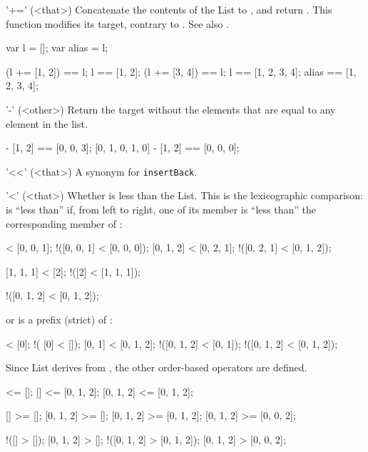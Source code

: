 \begin{urbiscriptapi}
\item['+='](<that>)%
  Concatenate the contents of the List  to \this, and return
  \this.  This function modifies its target, contrary to .  See
  also .

\begin{urbiassert}
var l = [];
var alias = l;

(l += [1, 2]) == l;
l == [1, 2];
(l += [3, 4]) == l;
l == [1, 2, 3, 4];
alias == [1, 2, 3, 4];
\end{urbiassert}

\item['-'](<other>)%
  Return the target without the elements that are equal to any element
  in the  list.

\begin{urbiassert}
[0, 1, 0, 2, 3] - [1, 2] == [0, 0, 3];
[0, 1, 0, 1, 0] - [1, 2] == [0, 0, 0];
\end{urbiassert}

\item['<<'](<that>)%
  A synonym for \lstinline|insertBack|.

\item['<'](<that>)%
  Whether \this is less than the \that List.  This is the lexicographic
  comparison: \this is ``less than'' \that if, from left to right, one of
  its member is ``less than'' the corresponding member of \that:

\begin{urbiassert}
  [0, 0, 0] < [0, 0, 1];    !([0, 0, 1] < [0, 0, 0]);
  [0, 1, 2] < [0, 2, 1];    !([0, 2, 1] < [0, 1, 2]);

  [1, 1, 1] < [2];          !([2] < [1, 1, 1]);

 !([0, 1, 2] < [0, 1, 2]);
\end{urbiassert}

  \noindent
  or \that is a prefix (strict) of \this:

\begin{urbiassert}
           [] < [0];          !(      [0] < []);
       [0, 1] < [0, 1, 2];    !([0, 1, 2] < [0, 1]);
  !([0, 1, 2] < [0, 1, 2]);
\end{urbiassert}

  Since List derives from , the other order-based
  operators are defined.

\begin{urbiassert}
        [] <= [];
        [] <= [0, 1, 2];
 [0, 1, 2] <= [0, 1, 2];

        [] >= [];
 [0, 1, 2] >= [];
 [0, 1, 2] >= [0, 1, 2];
 [0, 1, 2] >= [0, 0, 2];

       !([] > []);
  [0, 1, 2] > [];
!([0, 1, 2] > [0, 1, 2]);
  [0, 1, 2] > [0, 0, 2];
\end{urbiassert}
\end{urbiscriptapi}

